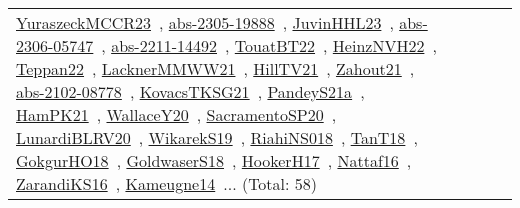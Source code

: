 {\begin{longtable}{lp{3cm}>{\raggedright\arraybackslash}p{6cm}>{\raggedright\arraybackslash}p{6cm}>{\raggedright\arraybackslash}p{8cm}}
\href{works/YuraszeckMCCR23.pdf}{YuraszeckMCCR23}~\cite{YuraszeckMCCR23}, \href{works/abs-2305-19888.pdf}{abs-2305-19888}~\cite{abs-2305-19888}, \href{works/JuvinHHL23.pdf}{JuvinHHL23}~\cite{JuvinHHL23}, \href{works/abs-2306-05747.pdf}{abs-2306-05747}~\cite{abs-2306-05747}, \href{works/abs-2211-14492.pdf}{abs-2211-14492}~\cite{abs-2211-14492}, \href{works/TouatBT22.pdf}{TouatBT22}~\cite{TouatBT22}, \href{works/HeinzNVH22.pdf}{HeinzNVH22}~\cite{HeinzNVH22}, \href{works/Teppan22.pdf}{Teppan22}~\cite{Teppan22}, \href{works/LacknerMMWW21.pdf}{LacknerMMWW21}~\cite{LacknerMMWW21}, \href{works/HillTV21.pdf}{HillTV21}~\cite{HillTV21}, \href{works/Zahout21.pdf}{Zahout21}~\cite{Zahout21}, \href{works/abs-2102-08778.pdf}{abs-2102-08778}~\cite{abs-2102-08778}, \href{works/KovacsTKSG21.pdf}{KovacsTKSG21}~\cite{KovacsTKSG21}, \href{works/PandeyS21a.pdf}{PandeyS21a}~\cite{PandeyS21a}, \href{works/HamPK21.pdf}{HamPK21}~\cite{HamPK21}, \href{works/WallaceY20.pdf}{WallaceY20}~\cite{WallaceY20}, \href{works/SacramentoSP20.pdf}{SacramentoSP20}~\cite{SacramentoSP20}, \href{works/LunardiBLRV20.pdf}{LunardiBLRV20}~\cite{LunardiBLRV20}, \href{works/WikarekS19.pdf}{WikarekS19}~\cite{WikarekS19}, \href{works/RiahiNS018.pdf}{RiahiNS018}~\cite{RiahiNS018}, \href{works/TanT18.pdf}{TanT18}~\cite{TanT18}, \href{works/GokgurHO18.pdf}{GokgurHO18}~\cite{GokgurHO18}, \href{works/GoldwaserS18.pdf}{GoldwaserS18}~\cite{GoldwaserS18}, \href{works/HookerH17.pdf}{HookerH17}~\cite{HookerH17}, \href{works/Nattaf16.pdf}{Nattaf16}~\cite{Nattaf16}, \href{works/ZarandiKS16.pdf}{ZarandiKS16}~\cite{ZarandiKS16}, \href{works/Kameugne14.pdf}{Kameugne14}~\cite{Kameugne14}... (Total: 58)\\

\end{longtable}}
